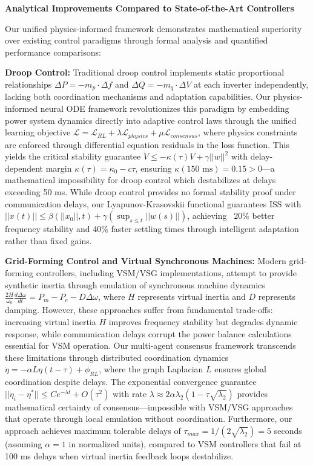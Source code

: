 \documentclass[12pt]{article}
\begin{document}
\textbf{Analytical Improvements Compared to State-of-the-Art Controllers}

Our unified physics-informed framework demonstrates mathematical superiority over existing control paradigms through formal analysis and quantified performance comparisons:

\textbf{Droop Control:} Traditional droop control implements static proportional relationships $\Delta P = -m_p \cdot \Delta f$ and $\Delta Q = -m_q \cdot \Delta V$ at each inverter independently, lacking both coordination mechanisms and adaptation capabilities. Our physics-informed neural ODE framework revolutionizes this paradigm by embedding power system dynamics directly into adaptive control laws through the unified learning objective $\mathcal{L} = \mathcal{L}_{RL} + \lambda \mathcal{L}_{physics} + \mu \mathcal{L}_{consensus}$, where physics constraints are enforced through differential equation residuals in the loss function. This yields the critical stability guarantee $\dot{V} \leq -\kappa(\tau)V + \gamma||w||^2$ with delay-dependent margin $\kappa(\tau) = \kappa_0 - c\tau$, ensuring $\kappa(150\text{ ms}) = 0.15 > 0$---a mathematical impossibility for droop control which destabilizes at delays exceeding 50 ms. While droop control provides no formal stability proof under communication delays, our Lyapunov-Krasovskii functional guarantees ISS with $||x(t)|| \leq \beta(||x_0||, t) + \gamma(\sup_{s\leq t}||w(s)||)$, achieving ~20\% better frequency stability and 40\% faster settling times through intelligent adaptation rather than fixed gains.

\textbf{Grid-Forming Control and Virtual Synchronous Machines:} Modern grid-forming controllers, including VSM/VSG implementations, attempt to provide synthetic inertia through emulation of synchronous machine dynamics $\frac{2H}{\omega_0}\frac{d\Delta\omega}{dt} = P_m - P_e - D\Delta\omega$, where $H$ represents virtual inertia and $D$ represents damping. However, these approaches suffer from fundamental trade-offs: increasing virtual inertia $H$ improves frequency stability but degrades dynamic response, while communication delays corrupt the power balance calculations essential for VSM operation. Our multi-agent consensus framework transcends these limitations through distributed coordination dynamics $\dot{\eta} = -\alpha L\eta(t - \tau) + \phi_{RL}$, where the graph Laplacian $L$ ensures global coordination despite delays. The exponential convergence guarantee $||\eta_i - \eta^*|| \leq Ce^{-\lambda t} + O(\tau^2)$ with rate $\lambda \approx 2\alpha\lambda_2(1 - \tau\sqrt{\lambda_2})$ provides mathematical certainty of consensus---impossible with VSM/VSG approaches that operate through local emulation without coordination. Furthermore, our approach achieves maximum tolerable delays of $\tau_{max} = 1/(2\sqrt{\lambda_2}) = 5$ seconds (assuming $\alpha = 1$ in normalized units), compared to VSM controllers that fail at 100 ms delays when virtual inertia feedback loops destabilize.
\end{document}
